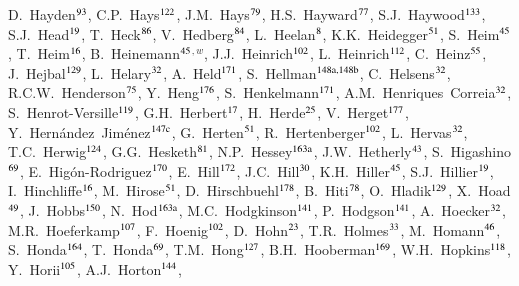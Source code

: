 \begin{flushleft}
D.~Hayden$^\textrm{\scriptsize 93}$,
C.P.~Hays$^\textrm{\scriptsize 122}$,
J.M.~Hays$^\textrm{\scriptsize 79}$,
H.S.~Hayward$^\textrm{\scriptsize 77}$,
S.J.~Haywood$^\textrm{\scriptsize 133}$,
S.J.~Head$^\textrm{\scriptsize 19}$,
T.~Heck$^\textrm{\scriptsize 86}$,
V.~Hedberg$^\textrm{\scriptsize 84}$,
L.~Heelan$^\textrm{\scriptsize 8}$,
K.K.~Heidegger$^\textrm{\scriptsize 51}$,
S.~Heim$^\textrm{\scriptsize 45}$,
T.~Heim$^\textrm{\scriptsize 16}$,
B.~Heinemann$^\textrm{\scriptsize 45}$$^{,w}$,
J.J.~Heinrich$^\textrm{\scriptsize 102}$,
L.~Heinrich$^\textrm{\scriptsize 112}$,
C.~Heinz$^\textrm{\scriptsize 55}$,
J.~Hejbal$^\textrm{\scriptsize 129}$,
L.~Helary$^\textrm{\scriptsize 32}$,
A.~Held$^\textrm{\scriptsize 171}$,
S.~Hellman$^\textrm{\scriptsize 148a,148b}$,
C.~Helsens$^\textrm{\scriptsize 32}$,
R.C.W.~Henderson$^\textrm{\scriptsize 75}$,
Y.~Heng$^\textrm{\scriptsize 176}$,
S.~Henkelmann$^\textrm{\scriptsize 171}$,
A.M.~Henriques~Correia$^\textrm{\scriptsize 32}$,
S.~Henrot-Versille$^\textrm{\scriptsize 119}$,
G.H.~Herbert$^\textrm{\scriptsize 17}$,
H.~Herde$^\textrm{\scriptsize 25}$,
V.~Herget$^\textrm{\scriptsize 177}$,
Y.~Hern\'andez~Jim\'enez$^\textrm{\scriptsize 147c}$,
G.~Herten$^\textrm{\scriptsize 51}$,
R.~Hertenberger$^\textrm{\scriptsize 102}$,
L.~Hervas$^\textrm{\scriptsize 32}$,
T.C.~Herwig$^\textrm{\scriptsize 124}$,
G.G.~Hesketh$^\textrm{\scriptsize 81}$,
N.P.~Hessey$^\textrm{\scriptsize 163a}$,
J.W.~Hetherly$^\textrm{\scriptsize 43}$,
S.~Higashino$^\textrm{\scriptsize 69}$,
E.~Hig\'on-Rodriguez$^\textrm{\scriptsize 170}$,
E.~Hill$^\textrm{\scriptsize 172}$,
J.C.~Hill$^\textrm{\scriptsize 30}$,
K.H.~Hiller$^\textrm{\scriptsize 45}$,
S.J.~Hillier$^\textrm{\scriptsize 19}$,
I.~Hinchliffe$^\textrm{\scriptsize 16}$,
M.~Hirose$^\textrm{\scriptsize 51}$,
D.~Hirschbuehl$^\textrm{\scriptsize 178}$,
B.~Hiti$^\textrm{\scriptsize 78}$,
O.~Hladik$^\textrm{\scriptsize 129}$,
X.~Hoad$^\textrm{\scriptsize 49}$,
J.~Hobbs$^\textrm{\scriptsize 150}$,
N.~Hod$^\textrm{\scriptsize 163a}$,
M.C.~Hodgkinson$^\textrm{\scriptsize 141}$,
P.~Hodgson$^\textrm{\scriptsize 141}$,
A.~Hoecker$^\textrm{\scriptsize 32}$,
M.R.~Hoeferkamp$^\textrm{\scriptsize 107}$,
F.~Hoenig$^\textrm{\scriptsize 102}$,
D.~Hohn$^\textrm{\scriptsize 23}$,
T.R.~Holmes$^\textrm{\scriptsize 33}$,
M.~Homann$^\textrm{\scriptsize 46}$,
S.~Honda$^\textrm{\scriptsize 164}$,
T.~Honda$^\textrm{\scriptsize 69}$,
T.M.~Hong$^\textrm{\scriptsize 127}$,
B.H.~Hooberman$^\textrm{\scriptsize 169}$,
W.H.~Hopkins$^\textrm{\scriptsize 118}$,
Y.~Horii$^\textrm{\scriptsize 105}$,
A.J.~Horton$^\textrm{\scriptsize 144}$,
$$
\end{flushleft}
